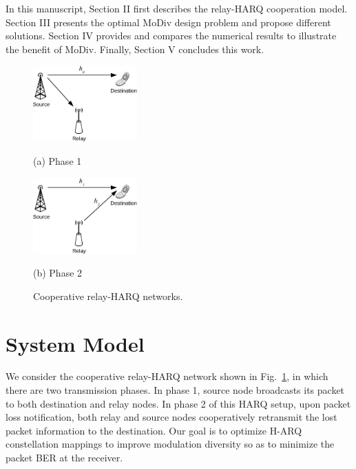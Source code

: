 \documentclass[journal,draftcls,onecolumn,12pt,twoside]{IEEEtran}
\begin{document}
In this manuscript, Section II first describes the relay-HARQ cooperation model.
Section III presents the optimal MoDiv design problem and propose different
solutions. Section IV provides and compares the numerical results to illustrate
the benefit of MoDiv. Finally, Section V concludes this work. 

\begin{figure}[!t]
    \begin{minipage}[b]{0.48\linewidth}
      \centering
      \centerline{\includegraphics[width=4.0cm]{./figs/relayHARQ1.eps}}
      \centerline{(a) Phase 1}\medskip
    \end{minipage}
    \hfill
    \begin{minipage}[b]{.48\linewidth}
      \centering
      \centerline{\includegraphics[width=4.0cm]{./figs/relayHARQ2.eps}}
      \centerline{(b) Phase 2}\medskip
    \end{minipage}
    \caption{Cooperative relay-HARQ networks.}
    \label{fig:system_model}
\end{figure}


\vspace*{-2mm}
\section{System Model}
\label{sec:model}
\vspace*{-2mm}
We consider the cooperative relay-HARQ network shown in
Fig.~\ref{fig:system_model}, in which there are two transmission phases.
In phase 1, source node broadcasts its packet to both destination and relay
nodes.
In phase 2 of this HARQ setup, upon packet loss notification, both relay and
source nodes cooperatively retransmit the lost packet information to the
destination. Our goal is to optimize H-ARQ constellation mappings to improve
modulation diversity so as to minimize the packet BER at the receiver.
\end{document}
